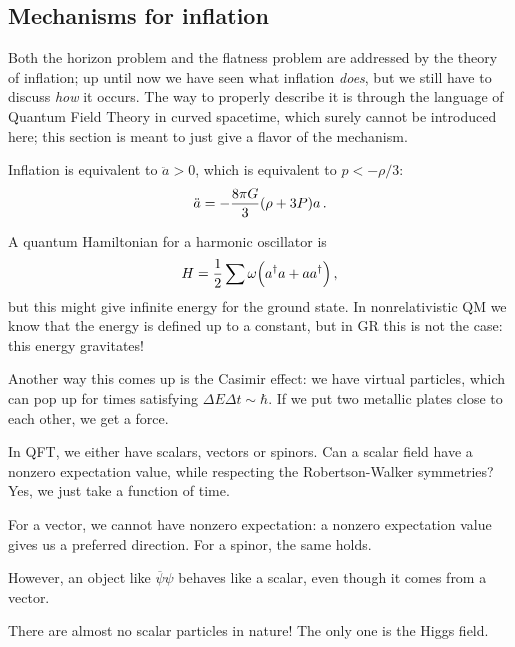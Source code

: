 \documentclass[main.tex]{subfiles}
\begin{document}
\subsection{Mechanisms for inflation}

Both the horizon problem and the flatness problem are addressed by the theory of inflation; up until now we have seen what inflation \emph{does}, but we still have to discuss \emph{how} it occurs. 
The way to properly describe it is through the language of Quantum Field Theory in curved spacetime, which surely cannot be introduced here; this section is meant to just give a flavor of the mechanism.

Inflation is equivalent to \(\ddot{a} > 0 \), which is equivalent to \( p< - \rho/ 3 \): 
%
\begin{align}
  \ddot{a} = - \frac{8 \pi G}{3} \qty(\rho + 3P) a
\,.
\end{align}

A quantum Hamiltonian for a harmonic oscillator is 
%
\begin{align}
  H = \frac{1}{2} \sum \omega \qty(a ^\dag a + a a ^\dag)
\,,
\end{align}
%
but this might give infinite energy for the ground state.
In nonrelativistic QM we know that the energy is defined up to a constant, but in GR this is not the case: this energy gravitates!

Another way this comes up is the Casimir effect: we have virtual particles, which can pop up for times satisfying \(\Delta E \Delta t \sim \hbar\).
If we put two metallic plates close to each other, we get a force.

In QFT, we either have scalars, vectors or spinors.
Can a scalar field have a nonzero expectation value, while respecting the Robertson-Walker symmetries? Yes, we just take a function of time.

For a vector, we cannot have nonzero expectation: a nonzero expectation value gives us a preferred direction.
For a spinor, the same holds.

However, an object like \(\overline{\psi} \psi \) behaves like a scalar, even though it comes from a vector.

There are almost no scalar particles in nature! The only one is the Higgs field.
\end{document}
